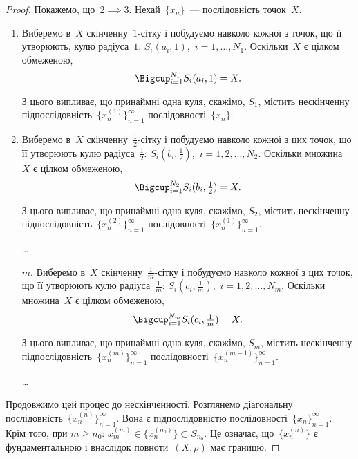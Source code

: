 \begin{proof}
Покажемо, що~$2 \implies 3$. Нехай~$\{x_n\}$~--- послідовність
точок~$X$.
\begin{enumerate}
\item Виберемо в~$X$ скінченну~$1$-сітку і побудуємо навколо
кожної з точок, що її утворюють, кулю радіуса~$1$:
$S_i(a_i, 1)$,~$i = 1, \dots, N_1$. Оскільки~$X$ є цілком обмеженою,
\begin{equation*}
    \Bigcup_{i = 1}^{N_1} S_i(a_i, 1) = X.
\end{equation*}

З цього випливає, що принаймні одна куля, скажімо,
$S_1$, містить нескінченну підпослідовність~$\{x_n^{(1)}\}_{n = 1}^\infty$
послідовності~$\{x_n\}$.

\item Виберемо в~$X$ скінченну~$\frac{1}{2}$-сітку і побудуємо навколо
кожної з цих точок, що її утворюють кулю радіуса~$\frac{1}{2}$:
$S_i(b_i, \frac{1}{2})$,~$i = 1, 2, \dots, N_2$. Оскільки множина~$X$ є цілком
обмеженою,
\begin{equation*}
    \Bigcup_{i = 1}^{N_2} S_i(b_i, \tfrac{1}{2}) = X.
\end{equation*}

З цього випливає, що принаймні одна куля, скажімо,
$S_2$, містить нескінченну підпослідовність~$\{x_n^{(2)}\}_{n = 1}^\infty$
послідовності~$\{x_n^{(1)}\}_{n = 1}^\infty$.

\dots

\item[$m$.] Виберемо в~$X$ скінченну~$\frac{1}{m}$-сітку і побудуємо
навколо кожної з цих точок, що її утворюють кулю
радіуса~$\frac{1}{m}$: $S_i(c_i, \frac{1}{m})$,~$i = 1, 2, \dots, N_m$. Оскільки
множина~$X$ є цілком обмеженою,
\begin{equation*}
    \Bigcup_{i = 1}^{N_m} S_i(c_i, \tfrac{1}{m}) = X.
\end{equation*}

З цього випливає, що принаймні одна куля, скажімо,
$S_m$, містить нескінченну підпослідовність~$\{x_n^{(m)}\}_{n = 1}^\infty$
послідовності~$\{x_n^{(m - 1)}\}_{n = 1}^\infty$.

\dots
\end{enumerate}

Продовжимо цей процес до нескінченності.
Розглянемо діагональну послідовність~$\{x_n^(n)\}_{n = 1}^\infty$. Вона є
підпослідовністю послідовності~$\{x_n\}_{n = 1}^\infty$. Крім того, при
$m \ge n_0$: $x_m^{(m)} \in \{x_n^{(n_0)}\} \subset S_{n_0}$.
Це означає, що~$\{x_n^{(n)}\}$ є
фундаментальною і внаслідок повноти~$(X, \rho)$ має границю.


\end{proof}
